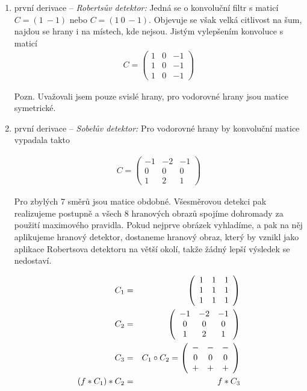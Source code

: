 \begin{enumerate}
\item první derivace -- {\em Robertsův detektor:}  Jedná se o konvoluční filtr s maticí $C=(1\ -1)$ nebo $C=(1\ 0\ -1)$.
Objevuje se však velká citlivost na šum, najdou se hrany i na místech, kde nejsou. Jistým vylepšením konvoluce s maticí
\begin{eqnarray}
C=\left(\begin{array}{ccc}1&0&-1\\1&0&-1\\1&0&-1\end{array}\right)
\end{eqnarray}

Pozn. Uvažovali jsem pouze svislé hrany, pro vodorovné hrany jsou matice symetrické.

\item první derivace -- {\em Sobelův detektor:} Pro vodorovné hrany by konvoluční matice vypadala takto

\begin{eqnarray}
C=\left(\begin{array}{ccc}-1&-2&-1\\0&0&0\\1&2&1\end{array}\right)
\end{eqnarray}

Pro zbylých 7 směrů jsou matice obdobné. Všesměrovou detekci pak realizujeme postupně a všech 8 hranových obrazů spojíme 
dohromady za použití maximového pravidla. Pokud nejprve obrázek vyhladíme, a pak na něj aplikujeme hranový detektor,
dostaneme hranový obraz, který by vznikl jako aplikace Robertsova detektoru na větší okolí, takže žádný lepší výsledek
se nedostaví.

\begin{eqnarray}
C_1&=&\left(\begin{array}{ccc}1&1&1\\1&1&1\\1&1&1\end{array}\right)\\
C_2&=&\left(\begin{array}{ccc}-1&-2&-1\\0&0&0\\1&2&1\end{array}\right)\\
C_3&=&C_1\circ C_2=\left(\begin{array}{ccc}-&-&-\\0&0&0\\+&+&+\end{array}\right)\\
(f\ast C_1)\ast C_2&=&f\ast C_3
\end{eqnarray}



\end{enumerate}
